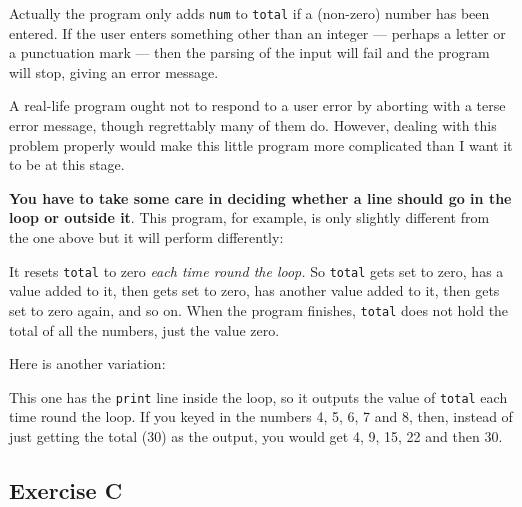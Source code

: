 Actually the program only adds  \texttt{num} to \texttt{total} if a (non-zero) 
number has been entered. 
If the user enters something other than an integer 
--- perhaps a letter or a punctuation mark --- 
then the parsing of the input will fail 
and the program will stop, giving an error message.

A real-life program ought not to respond to a user error by aborting
with a terse error message, though regrettably many of them do.
However, dealing with this problem properly would make this little program
more complicated than I want it to be at this stage.

\textbf{You have to take some care in deciding whether a line should go in the
loop or outside it}.  This program, for example, is only slightly different
from the one above but it will perform differently:


It resets \texttt{total} to zero \emph{each time round the loop.}  So
\texttt{total} gets set to zero,
has a value added to it, then gets set to zero, has another value added to
it, then gets set to zero again, and so on.  When the program finishes,
\texttt{total} does not hold the total of all the numbers, just the value
zero.

Here is another variation:


This one has the \texttt{print} line inside the loop, so it outputs the value
of \texttt{total} each time round the loop.  If you keyed in the numbers
4, 5, 6, 7 and 8, then, instead of just getting the total (30) as the output,
you would get 4, 9, 15, 22 and then 30.

\subsection*{Exercise C}

